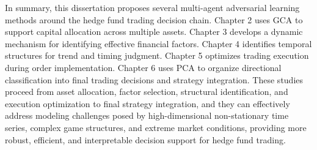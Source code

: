 \begin{eabstract}
In summary, this dissertation proposes several multi-agent adversarial learning methods around the hedge fund trading decision chain. Chapter 2 uses GCA to support capital allocation across multiple assets. Chapter 3 develops a dynamic mechanism for identifying effective financial factors. Chapter 4 identifies temporal structures for trend and timing judgment. Chapter 5 optimizes trading execution during order implementation. Chapter 6 uses PCA to organize directional classification into final trading decisions and strategy integration. These studies proceed from asset allocation, factor selection, structural identification, and execution optimization to final strategy integration, and they can effectively address modeling challenges posed by high-dimensional non-stationary time series, complex game structures, and extreme market conditions, providing more robust, efficient, and interpretable decision support for hedge fund trading.
\end{eabstract}

